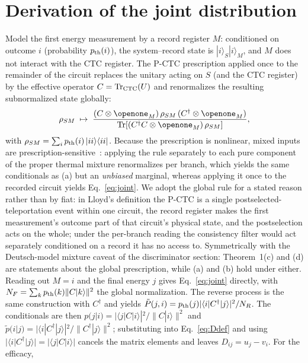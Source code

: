 \documentclass[aps,pra,twocolumn,superscriptaddress,nofootinbib]{revtex4-2}
\newcommand{\Tr}{\mathrm{Tr}}
\begin{document}
\appendix

\section{Derivation of the joint distribution}
\label{app:derivation}
Model the first energy measurement by a record register $M$: conditioned on outcome $i$ (probability $p_{\rm th}(i)$), the system--record state is $|i\rangle_S|i\rangle_M$, and $M$ does not interact with the CTC register. The P-CTC prescription applied once to the remainder of the circuit replaces the unitary acting on $S$ (and the CTC register) by the effective operator $C=\Tr_{\rm CTC}(U)$ and renormalizes the resulting subnormalized state globally:
\begin{equation}
\rho_{SM}\;\mapsto\;\frac{(C\otimes\openone_M)\,\rho_{SM}\,(C^\dagger\otimes\openone_M)}{\Tr\!\left[(C^\dagger C\otimes\openone_M)\,\rho_{SM}\right]},
\end{equation}
with $\rho_{SM}=\sum_i p_{\rm th}(i)\,|ii\rangle\langle ii|$. Because the prescription is nonlinear, mixed inputs are prescription-sensitive~\cite{blss2009}: applying the rule separately to each pure component of the proper thermal mixture renormalizes per branch, which yields the same conditionals as (a) but an \emph{unbiased} marginal, whereas applying it once to the recorded circuit yields Eq.~\eqref{eq:joint}. We adopt the global rule for a stated reason rather than by fiat: in Lloyd's definition the P-CTC is a single postselected-teleportation event within one circuit, the record register makes the first measurement's outcome part of that circuit's physical state, and the postselection acts on the whole; under the per-branch reading the consistency filter would act separately conditioned on a record it has no access to. Symmetrically with the Deutsch-model mixture caveat of the discriminator section: Theorem~1(c) and (d) are statements about the global prescription, while (a) and (b) hold under either. Reading out $M=i$ and the final energy $j$ gives Eq.~\eqref{eq:joint} directly, with $N_F=\sum_k p_{\rm th}(k)\lVert C|k\rangle\rVert^2$ the global normalization. The reverse process is the same construction with $C^\dagger$ and yields $\tilde P(j,i)=p_{\rm th}(j)|\langle i|C^\dagger|j\rangle|^2/N_R$. The conditionals are then $p(j|i)=|\langle j|C|i\rangle|^2/\lVert C|i\rangle\rVert^2$ and $\tilde p(i|j)=|\langle i|C^\dagger|j\rangle|^2/\lVert C^\dagger|j\rangle\rVert^2$; substituting into Eq.~\eqref{eq:Ddef} and using $|\langle i|C^\dagger|j\rangle|=|\langle j|C|i\rangle|$ cancels the matrix elements and leaves $D_{ij}=u_j-v_i$. For the efficacy,
\end{document}
